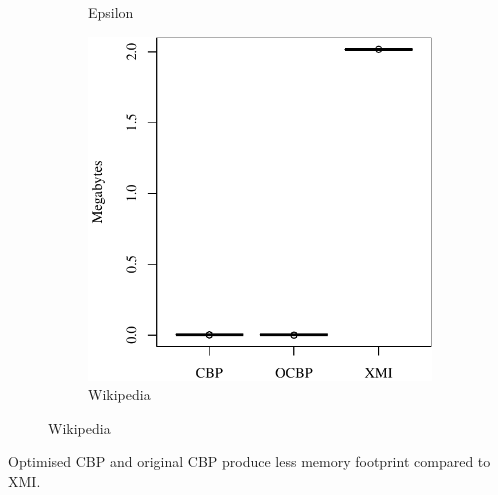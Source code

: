 \documentclass{beamer}
\begin{document}
\begin{frame}[fragile]
\begin{figure}
\begin{subfigure}{0.325\textwidth}
        \caption{Epsilon}
        \label{fig:save_memory_epsilon}
    \end{subfigure}
    \hfill
    \begin{subfigure}{0.325\textwidth}
        \centering
        \includegraphics[width=\linewidth]{save_memory_wikipedia}
        \caption{Wikipedia}
        \label{fig:save_memory_wikipedia}
    \end{subfigure}
    \label{fig:savememory}
\end{figure}
Optimised CBP and original CBP produce less memory footprint compared to XMI.
\end{frame}
\end{document}
